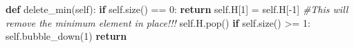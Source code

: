 \documentclass[
]{article}
\newenvironment{Shaded}{}{}
\newcommand{\CommentTok}[1]{\textcolor[rgb]{0.38,0.63,0.69}{\textit{#1}}}
\newcommand{\ControlFlowTok}[1]{\textcolor[rgb]{0.00,0.44,0.13}{\textbf{#1}}}
\newcommand{\DecValTok}[1]{\textcolor[rgb]{0.25,0.63,0.44}{#1}}
\newcommand{\KeywordTok}[1]{\textcolor[rgb]{0.00,0.44,0.13}{\textbf{#1}}}
\newcommand{\NormalTok}[1]{#1}
\newcommand{\OperatorTok}[1]{\textcolor[rgb]{0.40,0.40,0.40}{#1}}
\newcommand{\VariableTok}[1]{\textcolor[rgb]{0.10,0.09,0.49}{#1}}
\begin{document}
\begin{Shaded}
\begin{Highlighting}[]
    \KeywordTok{def}\NormalTok{ delete\_min(}\VariableTok{self}\NormalTok{):}
      \ControlFlowTok{if} \VariableTok{self}\NormalTok{.size() }\OperatorTok{==} \DecValTok{0}\NormalTok{:}
        \ControlFlowTok{return}
      \VariableTok{self}\NormalTok{.H[}\DecValTok{1}\NormalTok{] }\OperatorTok{=} \VariableTok{self}\NormalTok{.H[}\OperatorTok{{-}}\DecValTok{1}\NormalTok{] }\CommentTok{\#This will remove the minimum element in place!!!}
      \VariableTok{self}\NormalTok{.H.pop()}
      \ControlFlowTok{if} \VariableTok{self}\NormalTok{.size() }\OperatorTok{\textgreater{}=} \DecValTok{1}\NormalTok{:}
        \VariableTok{self}\NormalTok{.bubble\_down(}\DecValTok{1}\NormalTok{)}
      \ControlFlowTok{return}
\end{Highlighting}
\end{Shaded}
\end{document}
